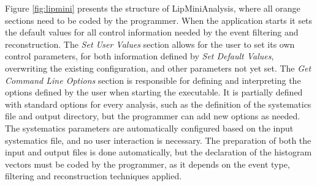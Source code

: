 Figure \ref{fig:lipmini} presents the structure of LipMiniAnalysis, where all orange sections need to be coded by the programmer. When the application starts it sets the default values for all control information needed by the event filtering and reconstruction. The \textit{Set User Values} section allows for the user to set its own control parameters, for both information defined by \textit{Set Default Values}, overwriting the existing configuration, and other parameters not yet set. The \textit{Get Command Line Options} section is responsible for defining and interpreting the options defined by the user when starting the executable. It is partially defined with standard options for every analysis, such as the definition of the systematics file and output directory, but the programmer can add new options as needed. The systematics parameters are automatically configured based on the input systematics file, and no user interaction is necessary. The preparation of both the input and output files is done automatically, but the declaration of the histogram vectors must be coded by the programmer, as it depends on the event type, filtering and reconstruction techniques applied.

